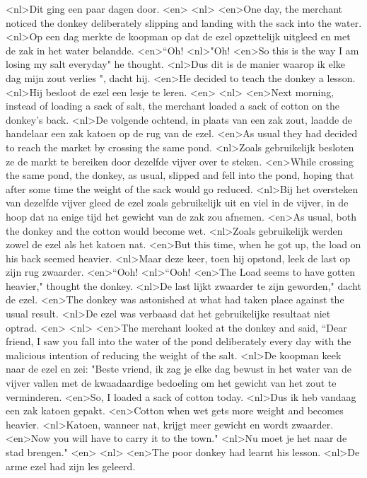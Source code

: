 <nl>Dit ging een paar dagen door.
<en>
<nl>
<en>One day, the merchant noticed the donkey deliberately slipping and landing with the sack into the water.
<nl>Op een dag merkte de koopman op dat de ezel opzettelijk uitgleed en met de zak in het water belandde.
<en>“Oh!
<nl>"Oh!
<en>So this is the way I am losing my salt everyday" he thought.
<nl>Dus dit is de manier waarop ik elke dag mijn zout verlies ", dacht hij.
<en>He decided to teach the donkey a lesson.
<nl>Hij besloot de ezel een lesje te leren.
<en>
<nl>
<en>Next morning, instead of loading a sack of salt, the merchant loaded a sack of cotton on the donkey’s back.
<nl>De volgende ochtend, in plaats van een zak zout, laadde de handelaar een zak katoen op de rug van de ezel.
<en>As usual they had decided to reach the market by crossing the same pond.
<nl>Zoals gebruikelijk  besloten ze   de markt te bereiken door  dezelfde vijver over te steken.
<en>While crossing the same pond, the donkey, as usual, slipped and fell into the pond, hoping that after some time the weight of the sack would go reduced.
<nl>Bij het oversteken van dezelfde vijver gleed de ezel zoals gebruikelijk uit en viel in de vijver, in de hoop dat na enige tijd het gewicht van de zak zou afnemen.
<en>As usual, both the donkey and the cotton would become wet.
<nl>Zoals gebruikelijk werden zowel de ezel als het katoen nat.
<en>But this time, when he got up, the load on his back seemed heavier.
<nl>Maar deze keer, toen hij opstond, leek de last op zijn rug zwaarder.
<en>“Ooh!
<nl>“Ooh!
<en>The Load seems to have gotten heavier," thought the donkey.
<nl>De last lijkt zwaarder te zijn geworden," dacht de ezel.
<en>The donkey was astonished at what had taken place against the usual result.
<nl>De ezel was  verbaasd dat  het gebruikelijke resultaat niet optrad.
<en>
<nl>
<en>The merchant looked at the donkey and said, “Dear friend, I saw you fall into the water of the pond deliberately every day with the malicious intention of reducing the weight of the salt.
<nl>De koopman keek naar de ezel en zei: "Beste vriend, ik zag je elke dag bewust in het water van de vijver vallen met de kwaadaardige bedoeling om het gewicht van het zout te verminderen.
<en>So, I loaded a sack of cotton today.
<nl>Dus ik heb vandaag een zak katoen gepakt.
<en>Cotton when wet gets more weight and becomes heavier.
<nl>Katoen, wanneer nat, krijgt meer gewicht en wordt zwaarder.
<en>Now you will have to carry it to the town."
<nl>Nu moet je het naar de stad brengen."
<en>
<nl>
<en>The poor donkey had learnt his lesson.
<nl>De arme ezel had zijn les geleerd.
